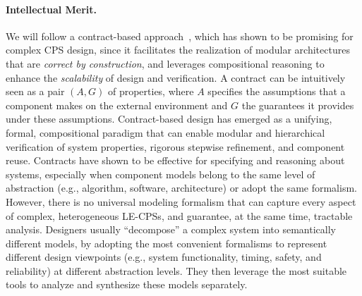 \documentclass[10pt]{dod-blank}
\begin{document}
\paragraph{Intellectual Merit.}

We will follow a contract-based approach~\cite{Nuzzo15b,Sangiovanni-Vincentelli2012a}, which has shown to be promising for complex CPS design, since it facilitates the realization of modular architectures that are \emph{correct by construction}, and leverages compositional reasoning to enhance the \emph{scalability} of design and verification. A contract can be intuitively seen as a pair $(A,G)$ of properties, where $A$ specifies the assumptions that a component makes on the external environment and $G$ the guarantees it provides under these assumptions. Contract-based design has emerged as a unifying, formal, compositional paradigm that can enable modular and hierarchical verification of system properties, 
rigorous stepwise refinement, 
and component reuse. 
% 
Contracts have shown to be effective for specifying and reasoning about systems, especially when component models belong to the same level of abstraction (e.g., algorithm, software, architecture) or adopt the same formalism. 
However, there is no universal modeling formalism that can capture every aspect of complex, heterogeneous LE-CPSs, and guarantee, at the same time, tractable analysis. Designers usually ``decompose'' a complex system into semantically different models, by adopting the most convenient formalisms to represent different design viewpoints (e.g., system functionality, timing, safety, and reliability) at different abstraction levels. They then leverage the most suitable tools to analyze and synthesize these models separately. 
\end{document}
